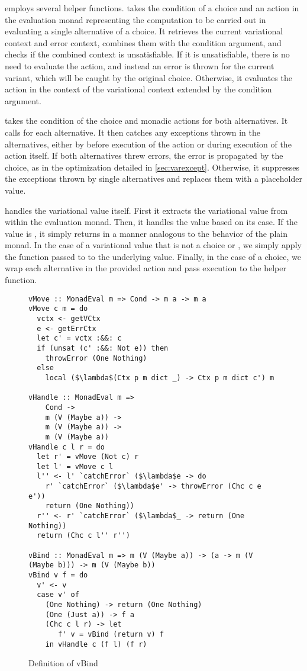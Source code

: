 \documentclass[12pt,oneside]{book}
\begin{document}
 employs several helper functions.  takes the condition of a choice and an action in the evaluation monad representing the
computation to be carried out in evaluating a single alternative of a choice. It retrieves the current variational context and error context,
combines them with the condition argument,
and checks if the combined context is unsatisfiable. If it is unsatisfiable, there is no need to evaluate the action, and instead an error is
thrown for the current variant, which will be caught by the original choice. Otherwise, it evaluates the action in the context of
the variational context extended by the condition argument.

 takes the condition of the choice and monadic actions for both alternatives. It calls  for each alternative.
It then catches any exceptions thrown in the alternatives, either by  before execution of the action or during execution of the action
itself. If both alternatives threw errors, the error is propagated by the choice, as in the optimization detailed in \ref{sec:varexcept}. Otherwise,
it suppresses the exceptions thrown by single alternatives and replaces them with a placeholder  value.

 handles the variational value itself. First it extracts the variational value from within the evaluation monad. Then, it handles
the value based on its case. If the value is , it simply returns  in a manner analogous to the behavior
of the plain  monad. In the case of a variational value that is not a choice or , we simply apply the function
passed to  to the underlying value. Finally, in the case of a choice, we wrap each alternative in the provided action
and pass execution to the  helper function.

\begin{figure}
\begin{lstlisting}
vMove :: MonadEval m => Cond -> m a -> m a
vMove c m = do
  vctx <- getVCtx
  e <- getErrCtx
  let c' = vctx :&&: c
  if (unsat (c' :&&: Not e)) then
    throwError (One Nothing)
  else
    local ($\lambda$(Ctx p m dict _) -> Ctx p m dict c') m

vHandle :: MonadEval m =>
    Cond -> 
    m (V (Maybe a)) -> 
    m (V (Maybe a)) -> 
    m (V (Maybe a))
vHandle c l r = do
  let r' = vMove (Not c) r
  let l' = vMove c l
  l'' <- l' `catchError` ($\lambda$e -> do
    r' `catchError` ($\lambda$e' -> throwError (Chc c e e'))
    return (One Nothing))
  r'' <- r' `catchError` ($\lambda$_ -> return (One Nothing))
  return (Chc c l'' r'')

vBind :: MonadEval m => m (V (Maybe a)) -> (a -> m (V (Maybe b))) -> m (V (Maybe b))
vBind v f = do
  v' <- v
  case v' of
    (One Nothing) -> return (One Nothing)
    (One (Just a)) -> f a
    (Chc c l r) -> let
       f' v = vBind (return v) f
    in vHandle c (f l) (f r)
\end{lstlisting}
\caption{Definition of vBind}
\label{fig:vbind}
\end{figure}
\end{document}
